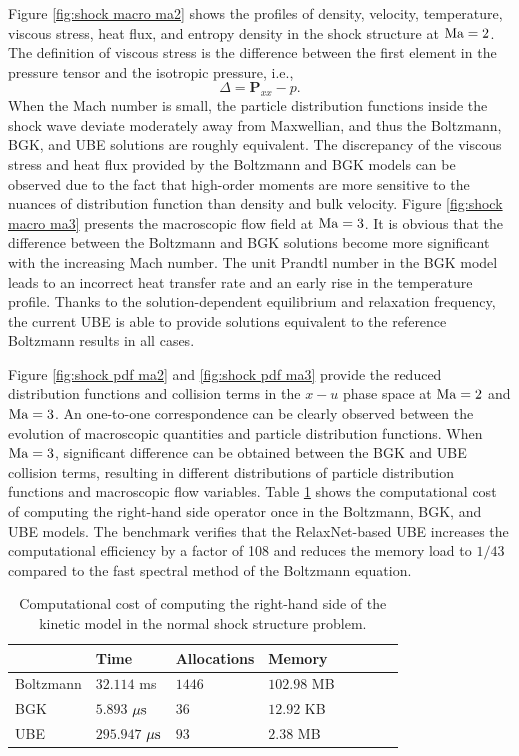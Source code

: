 \documentclass[preprint,3p,12pt,sort&compress]{elsarticle}
\begin{document}
Figure \ref{fig:shock macro ma2} shows the profiles of density, velocity, temperature, viscous stress, heat flux, and entropy density in the shock structure at $\rm Ma=2$.
The definition of viscous stress is the difference between the first element in the pressure tensor and the isotropic pressure, i.e.,
\begin{equation*}
    \Delta = \mathbf P_{xx} - p.
\end{equation*}
When the Mach number is small, the particle distribution functions inside the shock wave deviate moderately away from Maxwellian, and thus the Boltzmann, BGK, and UBE solutions are roughly equivalent.
The discrepancy of the viscous stress and heat flux provided by the Boltzmann and BGK models can be observed due to the fact that high-order moments are more sensitive to the nuances of distribution function than density and bulk velocity.
Figure \ref{fig:shock macro ma3} presents the macroscopic flow field at $\rm Ma=3$.
It is obvious that the difference between the Boltzmann and BGK solutions become more significant with the increasing Mach number.
The unit Prandtl number in the BGK model leads to an incorrect heat transfer rate and an early rise in the temperature profile.
Thanks to the solution-dependent equilibrium and relaxation frequency, the current UBE is able to provide solutions equivalent to the reference Boltzmann results in all cases.

Figure \ref{fig:shock pdf ma2} and \ref{fig:shock pdf ma3} provide the reduced distribution functions and collision terms in the $x-u$ phase space at $\rm Ma=2$ and $\rm Ma=3$.
An one-to-one correspondence can be clearly observed between the evolution of macroscopic quantities and particle distribution functions.
When $\rm Ma=3$, significant difference can be obtained between the BGK and UBE collision terms, resulting in different distributions of particle distribution functions and macroscopic flow variables.
Table \ref{tab:cost shock} shows the computational cost of computing the right-hand side operator once in the Boltzmann, BGK, and UBE models.
The benchmark verifies that the RelaxNet-based UBE increases the computational efficiency by a factor of 108 and reduces the memory load to $1/43$ compared to the fast spectral method of the Boltzmann equation.
\begin{table}[htbp]
	\caption{Computational cost of computing the right-hand side of the kinetic model in the normal shock structure problem.} 
	\centering
	\begin{tabular}{llllllll} 
		\hline
		 & Time & Allocations & Memory & \\
		\hline
		Boltzmann & $32.114$ ms & $1446$ & $102.98$ MB & \\
		BGK & $5.893$ $\rm \mu s$ & $36$ & $12.92$ KB & \\ 
		UBE & $295.947$ $\rm \mu s$ & $93$ & $2.38$ MB & \\
		\hline
	\end{tabular} 
	\label{tab:cost shock}
\end{table}
\end{document}
